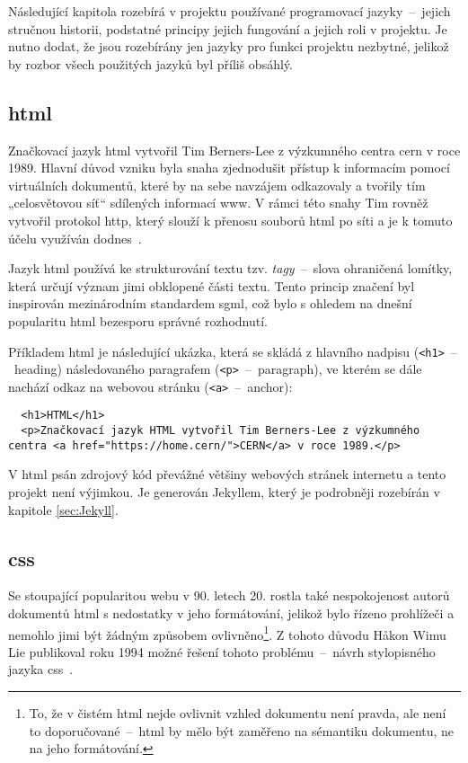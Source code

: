 \documentclass[a4paper, 12pt]{article}
\begin{document}
  Následující kapitola rozebírá v projektu používané programovací jazyky~--~jejich stručnou historii, podstatné principy jejich fungování a jejich roli v projektu. Je nutno dodat, že jsou rozebírány jen jazyky pro funkci projektu nezbytné, jelikož by rozbor všech použitých jazyků byl příliš obsáhlý.


  \subsection{\acrshort{html}} \label{sec:HTML}
  Značkovací jazyk \gls{html} vytvořil Tim Berners-Lee z výzkumného centra \gls{cern} v roce 1989. Hlavní důvod vzniku byla snaha zjednodušit přístup k informacím pomocí virtuálních dokumentů, které by na sebe navzájem odkazovaly a tvořily tím „celosvětovou síť“ sdílených informací \gls{www}. V rámci této snahy Tim rovněž vytvořil protokol \gls{http}, který slouží k přenosu souborů \gls{html} po síti a je k tomuto účelu využíván dodnes~\cite{html-history}.

  Jazyk \gls{html} používá ke strukturování textu tzv. \emph{tagy}~--~slova ohraničená lomítky, která určují význam jimi obklopené části textu. Tento princip značení byl inspirován mezinárodním standardem \gls{sgml}, což bylo s ohledem na dnešní popularitu \gls{html} bezesporu správné rozhodnutí.

  Příkladem \gls{html} je následující ukázka, která se skládá z hlavního nadpisu (\texttt{<h1>}~--~heading) následovaného paragrafem (\texttt{<p>}~--~paragraph), ve kterém se dále nachází odkaz na webovou stránku (\texttt{<a>}~--~anchor):

  \begin{verbatim}
  <h1>HTML</h1>
  <p>Značkovací jazyk HTML vytvořil Tim Berners-Lee z výzkumného centra <a href="https://home.cern/">CERN</a> v roce 1989.</p>
  \end{verbatim}

  V \gls{html} psán zdrojový kód převážné většiny webových stránek internetu a tento projekt není výjimkou. Je generován Jekyllem, který je podrobněji rozebírán v kapitole \ref{sec:Jekyll}.


  \subsection{\acrshort{css}} \label{sec:CSS}
  Se stoupající popularitou webu v 90. letech 20. rostla také nespokojenost autorů dokumentů \gls{html} s nedostatky v jeho formátování, jelikož bylo řízeno prohlížeči a nemohlo jimi být žádným způsobem ovlivněno\footnote{To, že v čistém \gls{html} nejde ovlivnit vzhled dokumentu není pravda, ale není to doporučované~--~\gls{html} by mělo být zaměřeno na sémantiku dokumentu, ne na jeho formátování.}. Z tohoto důvodu Håkon Wimu Lie publikoval roku 1994 možné řešení tohoto problému~--~návrh stylopisného jazyka \gls{css}~\cite{css-proposal,css-saga}.
\end{document}
